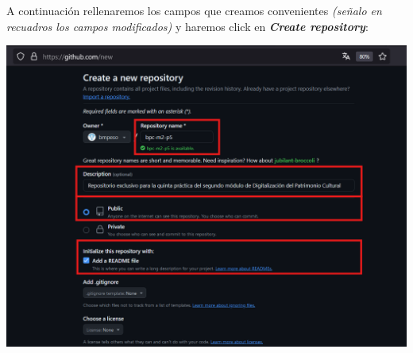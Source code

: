 \documentclass[options]{article}
\begin{document}
A continuación rellenaremos los campos que creamos convenientes \textit{(señalo en recuadros los campos modificados)} y haremos click en \textbf{\textit{Create repository}}:

\begin{center}
    \includegraphics[scale=0.45]{images/github_02.png}
\end{center}
\end{document}
